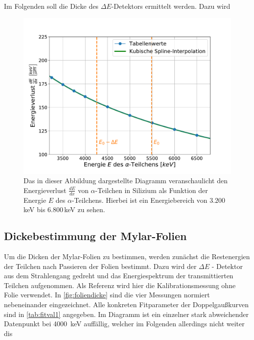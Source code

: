 Im Folgenden soll die Dicke des $\Delta E$-Detektors ermittelt werden.
Dazu wird 
\begin{figure}[H]
	\centering
	\includegraphics[width=1.0\textwidth]{src/EnergyLossSpectrum}
	\caption{Das in dieser Abbildung dargestellte Diagramm veranschaulicht den Energieverlust $\frac{dE}{dx}$ von $\alpha$-Teilchen in Silizium als Funktion der Energie $E$ des $\alpha$-Teilchens. Hierbei ist ein Energiebereich von $3.200\,$keV bis $6.800\,$keV zu sehen.}
	\label{EnergyLossSpectrum}
\end{figure}
\noindent 

\subsection{Dickebestimmung der Mylar-Folien}
\label{sec:dicke}

Um die Dicken der Mylar-Folien zu bestimmen, werden zunächst die Restenergien der Teilchen nach Passieren der Folien bestimmt.
Dazu wird der $\Delta E$ - Detektor aus dem Strahlengang gedreht und das Energiespektrum der transmittierten Teilchen aufgenommen.
Als Referenz wird hier die Kalibrationsmessung ohne Folie verwendet.
In \cref{fig:foliendicke} sind die vier Messungen normiert nebeneinander eingezeichnet.
Alle konkreten Fitparameter der Doppelgaußkurven sind in \cref{tab:fitval1} angegeben.
Im Diagramm ist ein einzelner stark abweichender Datenpunkt bei \SI{4000}{\kilo\electronvolt} auffällig, welcher im Folgenden allerdings nicht weiter dis

